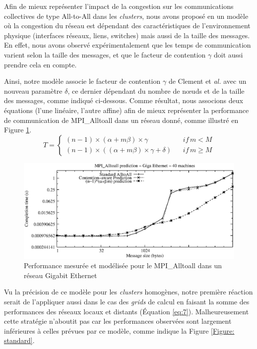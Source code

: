 Afin de mieux représenter l'impact de la congestion sur les communications collectives de type All-to-All dans les \textit{clusters}, nous avons proposé en \cite{Steffenel06b} un modèle où la congestion du réseau est dépendant des caractéristiques de l'environnement physique (interfaces réseaux, liens, switches) mais aussi de la taille des messages. En effet, nous avons observé expérimentalement que les temps de communication varient selon la taille des messages,  et que le facteur de contention  $\gamma$ doit aussi prendre cela en compte. 

Ainsi, notre modèle associe le facteur de contention $\gamma$ de Clement et \textit{al.} \cite{Clement96} avec un nouveau paramètre $\delta$, ce dernier dépendant du nombre de n{\oe}uds et de la taille des messages, comme indiqué ci-dessous. Comme résultat, nous associons deux équations (l'une linéaire, l'autre affine) afin de mieux représenter la performance de communication de MPI\_Alltoall dans un réseau donné, comme illustré en Figure \ref{Figure: local}.
\begin{equation}
T=\left\{ \begin{array}{lc}
(n-1)\times(\alpha+m\beta)\times\gamma & if\, m<M\\
(n-1)\times((\alpha+m\beta)\times\gamma+\delta)\,\,\,\,\, & if\, m\geq M\end{array}\right.\label{eq:6}\end{equation}

\begin{figure}
	\centering
		\includegraphics[width=0.7\columnwidth]{images/newcomp24_pred_log}
	\caption{\label{Figure: local}Performance mesurée et modélisée pour le MPI\_Alltoall dans un réseau Gigabit Ethernet}
\end{figure}


Vu la précision de ce modèle pour les \textit{clusters} homogènes, notre première réaction serait de l'appliquer aussi dans le cas des \textit{grids} de calcul en faisant la somme des performances des réseaux locaux et distants (Équation \ref{eq:7}). Malheureusement cette stratégie n'aboutit pas car les performances observées sont largement inférieures à celles prévues par ce modèle, comme indique la Figure \ref{Figure: standard}. 

